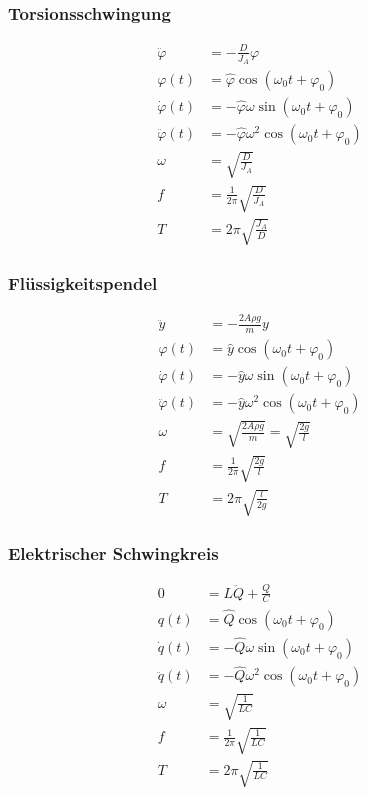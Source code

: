 \begin{multicols}{2}{}
\subsubsection*{Torsionsschwingung}
\begin{align*}
\ddot{\varphi}&=-\frac{D}{J_A}\varphi\\
\varphi(t)&=\hat{\varphi}\cos(\omega_0 t+\varphi_0)\\
\dot{\varphi}(t)&=-\hat{\varphi}\omega\sin(\omega_0 t+\varphi_0)\\
\ddot{\varphi}(t)&=-\hat{\varphi}\omega^2\cos(\omega_0 t+\varphi_0)\\
\omega&=\sqrt{\frac{D}{J_A}}\\
f&=\frac{1}{2\pi}\sqrt{\frac{D}{J_A}}\\
T&=2\pi\sqrt{\frac{J_A}{D}}
\end{align*}



\subsubsection*{Flüssigkeitspendel}
\begin{align*}
\ddot{y}&=-\frac{2A\rho g}{m}y\\
\varphi(t)&=\hat{y}\cos(\omega_0 t+\varphi_0)\\
\dot{\varphi}(t)&=-\hat{y}\omega\sin(\omega_0 t+\varphi_0)\\
\ddot{\varphi}(t)&=-\hat{y}\omega^2\cos(\omega_0 t+\varphi_0)\\
\omega&=\sqrt{\frac{2A\rho g}{m}}=\sqrt{\frac{2g}{l}}\\
f&=\frac{1}{2\pi}\sqrt{\frac{2g}{l}}\\
T&=2\pi\sqrt{\frac{l}{2g}}
\end{align*}
\end{multicols}

\begin{multicols}{2}
\subsubsection*{Elektrischer Schwingkreis}
\begin{align*}
0&=L\ddot{Q}+\frac{Q}{C}\\
q(t)&=\hat{Q}\cos(\omega_0 t+\varphi_0)\\
\dot{q}(t)&=-\hat{Q}\omega\sin(\omega_0 t+\varphi_0)\\
\ddot{q}(t)&=-\hat{Q}\omega^2\cos(\omega_0 t+\varphi_0)\\
\omega&=\sqrt{\frac{1}{LC}}\\
f&=\frac{1}{2\pi}\sqrt{\frac{1}{LC}}\\
T&=2\pi\sqrt{\frac{1}{LC}}
\end{align*}
\vfill
\end{multicols}


